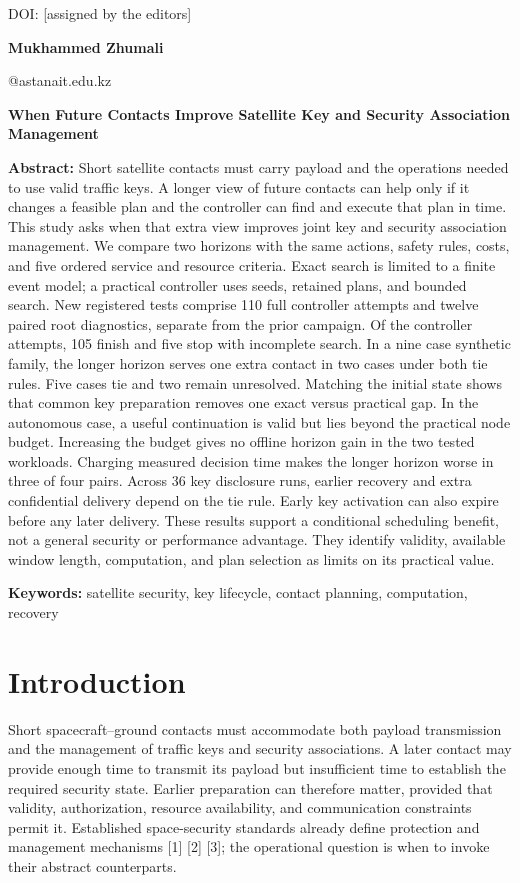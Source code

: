 \documentclass[12pt,a4paper]{article}
\begin{document}
\noindent DOI: [assigned by the editors]\par
\noindent\textbf{Mukhammed Zhumali}\par
{}@astanait.edu.kz\par
{}\par
\begin{center}\textbf{When Future Contacts Improve Satellite Key and Security Association Management}\end{center}
\textbf{Abstract:} Short satellite contacts must carry payload and the operations needed to use valid traffic keys. A longer view of future contacts can help only if it changes a feasible plan and the controller can find and execute that plan in time. This study asks when that extra view improves joint key and security association management. We compare two horizons with the same actions, safety rules, costs, and five ordered service and resource criteria. Exact search is limited to a finite event model; a practical controller uses seeds, retained plans, and bounded search. New registered tests comprise 110 full controller attempts and twelve paired root diagnostics, separate from the prior campaign. Of the controller attempts, 105 finish and five stop with incomplete search. In a nine case synthetic family, the longer horizon serves one extra contact in two cases under both tie rules. Five cases tie and two remain unresolved. Matching the initial state shows that common key preparation removes one exact versus practical gap. In the autonomous case, a useful continuation is valid but lies beyond the practical node budget. Increasing the budget gives no offline horizon gain in the two tested workloads. Charging measured decision time makes the longer horizon worse in three of four pairs. Across 36 key disclosure runs, earlier recovery and extra confidential delivery depend on the tie rule. Early key activation can also expire before any later delivery. These results support a conditional scheduling benefit, not a general security or performance advantage. They identify validity, available window length, computation, and plan selection as limits on its practical value.

\textbf{Keywords:} satellite security, key lifecycle, contact planning, computation, recovery

\section*{Introduction}
Short spacecraft--ground contacts must accommodate both payload transmission and the management of traffic keys and security associations. A later contact may provide enough time to transmit its payload but insufficient time to establish the required security state. Earlier preparation can therefore matter, provided that validity, authorization, resource availability, and communication constraints permit it. Established space-security standards already define protection and management mechanisms [1] [2] [3]; the operational question is when to invoke their abstract counterparts.
\end{document}
